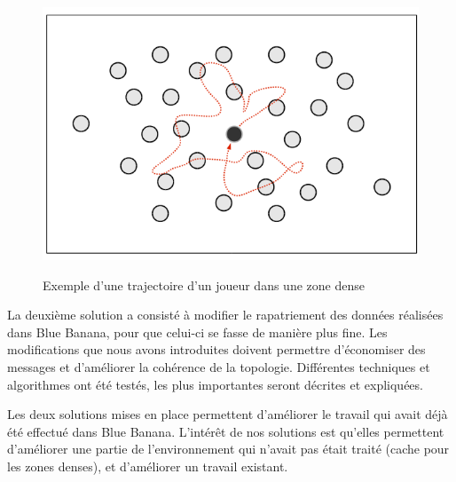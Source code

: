 	\vspace{5mm}
        \begin{figure}[!h]
        \centering
        \includegraphics[scale=0.45]{./Ressources/Images/mouvementsZoneDense.png}\\
        \caption{Exemple d'une trajectoire d'un joueur dans une zone dense}
        \label{mouveDense}
        \end{figure}
\par La deuxième solution a consisté à modifier le rapatriement des données réalisées dans Blue Banana, pour que celui-ci se fasse de manière plus fine. Les modifications que nous avons introduites doivent permettre d'économiser des messages et d'améliorer la cohérence de la topologie. Différentes techniques et algorithmes ont été testés, les plus importantes seront décrites et expliquées.
\par Les deux solutions mises en place permettent d'améliorer le travail qui avait déjà été effectué dans Blue Banana. L'intérêt de nos solutions est qu'elles permettent d'améliorer une partie de l'environnement qui n'avait pas était traité (cache pour les zones denses), et d'améliorer un travail existant.

\newpage


